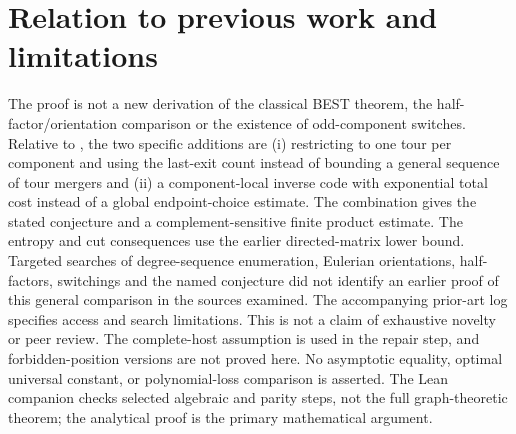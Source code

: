 \documentclass[11pt]{article}
\theoremstyle{remark}\newtheorem{remark}[theorem]{Remark}
\begin{document}
\section{Relation to previous work and limitations}
The proof is not a new derivation of the classical BEST theorem, the half-factor/orientation comparison or the existence of odd-component switches. Relative to \cite[Section 9]{mehrdad26}, the two specific additions are (i) restricting to one tour per component and using the last-exit count instead of bounding a general sequence of tour mergers and (ii) a component-local inverse code with exponential total cost instead of a global endpoint-choice estimate. The combination gives the stated conjecture and a complement-sensitive finite product estimate. The entropy and cut consequences use the earlier directed-matrix lower bound. Targeted searches of degree-sequence enumeration, Eulerian orientations, half-factors, switchings and the named conjecture did not identify an earlier proof of this general comparison in the sources examined. The accompanying prior-art log specifies access and search limitations. This is not a claim of exhaustive novelty or peer review. The complete-host assumption is used in the repair step, and forbidden-position versions are not proved here. No asymptotic equality, optimal universal constant, or polynomial-loss comparison is asserted. The Lean companion checks selected algebraic and parity steps, not the full graph-theoretic theorem; the analytical proof is the primary mathematical argument.
\end{document}
